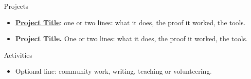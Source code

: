 \documentclass{resume}
\begin{document}
\begin{rSection}{Projects}
\begin{itemize}
  \itemsep -3pt {}
  \item \href{https://example.com/project}{\textbf{Project Title}}: one or two lines: what it does, the proof it worked, the tools.
  \item \textbf{Project Title.} One or two lines: what it does, the proof it worked, the tools.
\end{itemize}
\end{rSection}

\begin{rSection}{Activities}
\begin{itemize}
  \itemsep -3pt {}
  \item Optional line: community work, writing, teaching or volunteering.
\end{itemize}
\end{rSection}
\end{document}
